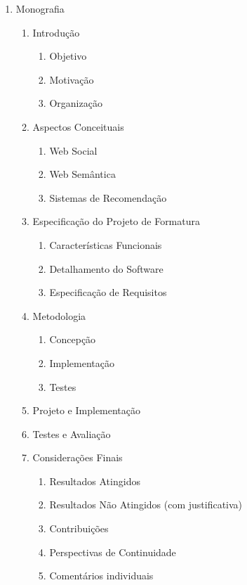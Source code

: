 \documentclass[]{article}
\begin{document}
\begin{enumerate}
	\item  Monografia
	\begin{enumerate}
		\item Introdução
		\begin{enumerate}
		  \item Objetivo
		  \item Motivação
		  \item Organização
		\end{enumerate}
		\item Aspectos Conceituais
		\begin{enumerate}
		  \item Web Social
		  \item Web Semântica
		  \item Sistemas de Recomendação
		\end{enumerate}
		\item Especificação do Projeto de Formatura
		\begin{enumerate}
		  \item Características Funcionais
		  \item Detalhamento do Software
		  \item Especificação de Requisitos
		\end{enumerate}
		\item Metodologia
		\begin{enumerate}
		  \item Concepção
		  \item Implementação
		  \item Testes
		\end{enumerate}
		\item Projeto e Implementação
		\item Testes e Avaliação
		\item Considerações Finais
		\begin{enumerate}
		  \item Resultados Atingidos
		  \item Resultados Não Atingidos (com justificativa)
		  \item Contribuições
		  \item Perspectivas de Continuidade
		  \item Comentários individuais
		\end{enumerate}
	\end{enumerate}
		

\end{enumerate}
\end{document}
